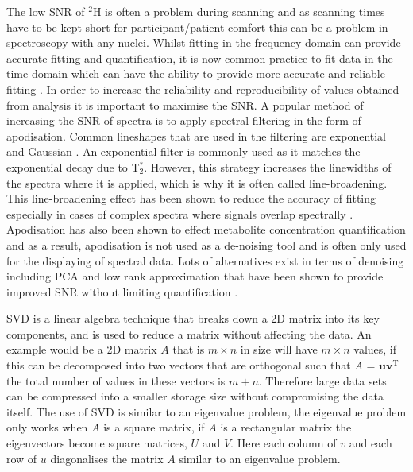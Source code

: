 The low \ac{SNR} of $^2$H is often a problem during scanning and as scanning times have to be kept short for participant/patient comfort this can be a problem in spectroscopy with any nuclei. Whilst fitting in the frequency domain can provide accurate fitting and quantification, it is now common practice to fit data in the time-domain which can have the ability to provide more accurate and reliable fitting \cite{Joliot1991InMethods}. In order to increase the reliability and reproducibility of values obtained from analysis it is important to maximise the \ac{SNR}. A popular method of increasing the \ac{SNR} of spectra is to apply spectral filtering in the form of apodisation. Common lineshapes that are used in the filtering are exponential and Gaussian \cite{Goryawala2020EffectsFitting}. An exponential filter is commonly used as it matches the exponential decay due to T$_2^*$. However, this strategy increases the linewidths of the spectra where it is applied, which is why it is often called line-broadening. This line-broadening effect has been shown to reduce the accuracy of fitting especially in cases of complex spectra where signals overlap spectrally \cite{Bartha1999FactorsFiltering}. Apodisation has also been shown to effect metabolite concentration quantification \cite{Goryawala2020EffectsFitting} and as a result, apodisation is not used as a de-noising tool and is often only used for the displaying of spectral data. Lots of alternatives exist in terms of denoising including \ac{PCA} \cite{Abdoli2016DenoisingComponents} and low rank approximation \cite{Nguyen2013DenoisingApproximations} that have been shown to provide improved \ac{SNR} without limiting quantification \cite{Clarke2022UncertaintyMethods}. 


\ac{SVD} is a linear algebra technique that breaks down a 2D matrix into its key components, and is used to reduce a matrix without affecting the data. An example would be a 2D matrix $A$ that is $m \times n$ in size will have $m \times n$ values, if this can be decomposed into two vectors that are orthogonal such that $A$ = $\mathbf{uv}^\textrm{T}$ the total number of values in these vectors is $m+n$. Therefore large data sets can be compressed into a smaller storage size without compromising the data itself. The use of \ac{SVD} is similar to an eigenvalue problem, the eigenvalue problem only works when $A$ is a square matrix, if $A$ is a rectangular matrix the eigenvectors become square matrices, $U$ and $V$. Here each column of $v$ and each row of $u$ diagonalises the matrix $A$ similar to an eigenvalue problem.

